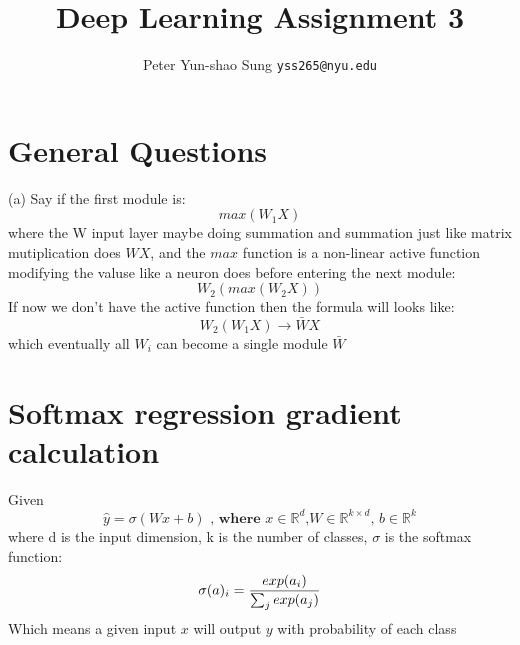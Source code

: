 \documentclass{article}
\title{Deep Learning Assignment 3}
\author{
  Peter Yun-shao Sung
  \texttt{yss265@nyu.edu} \\
}
\begin{document}

\maketitle
\section{General Questions}
(a) Say if the first module is:
\begin{equation}
max(W_1X)
\end{equation}
where the W input layer maybe doing summation and summation just like matrix mutiplication does $WX$, and the $max$ function is a non-linear active function modifying the valuse like a neuron does before entering the next module:
\begin{equation}
W_2(max(W_2X))
\end{equation}
If now we don't have the active function then the formula will looks like:
\begin{equation}
W_2(W_1X) \to \bar{W}X
\end{equation}
which eventually all $W_i$ can become a single module $\bar{W}$

\section{Softmax regression gradient calculation}
Given
\begin{equation}
\hat{y} = \sigma (Wx+b) \textbf{ , where $x \in \mathbb{R}^d$,$W \in \mathbb{R}^{k\times d}$, $b \in \mathbb{R}^k$}
\end{equation}
where d is the input dimension, k is the number of classes, $\sigma$ is the softmax function:
\begin{equation}
\sigma(a)_i = {exp(a_i) \over \sum_j exp(a_j)}
\end{equation}
Which means a given input $x$ will output $y$ with probability of each class
\end{document}
